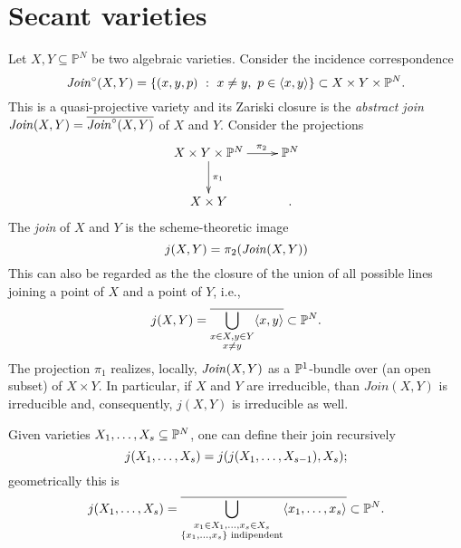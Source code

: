  \section{Secant varieties}
 \label{geometrySecants-section-secants}
 
 \begin{definition}
 \label{geometrySecants-definition-join}
 Let $X,Y \subseteq \mathbb{P}^N$ be two algebraic varieties. Consider the incidence correspondence 
 \[
     \mathit{Join}^\circ(X,Y) = \{(x,y,p) ~:~ x \neq y,~p \in \langle x,y \rangle\} \subset X \times Y \times \mathbb{P}^N.
 \]
 This is a quasi-projective variety and its Zariski closure is the {\it abstract join} $\mathit{Join}(X,Y) = \overline{\mathit{Join}^\circ(X,Y)}$ of $X$ and $Y$. Consider the projections 
 \[
     \xymatrix{
         X \times Y \times \bbP^N \ar[d]^{\pi_1} \ar[r]^(0.65){\pi_2} & \bbP^N\\
         X \times Y & .
     }
 \]
 The \emph{join} of $X$ and $Y$ is the scheme-theoretic image 
 \[
     j(X,Y) = \pi_2(\mathit{Join}(X,Y))
 \]
 This can also be regarded as the the closure of the union of all possible lines joining a point of $X$ and a point of $Y$, i.e.,
 \[
     j(X,Y) = \overline{ \bigcup_{\substack{x \in X, y \in Y \\ x \neq y}} \langle x,y \rangle} \subset \mathbb{P}^N.
 \]
 The projection $\pi_1$ realizes, locally, $\mathit{Join}(X,Y)$ as a $\mathbb{P}^1$-bundle over (an open subset) of $X \times Y$. In particular, if $X$ and $Y$ are irreducible, than $Join(X,Y)$ is irreducible and, consequently, $j(X,Y)$ is irreducible as well.
 
 Given varieties $X_1 , \ldots , X_s \subseteq \mathbb{P}^N$, one can define their join recursively
 \[
     j( X_1 , \ldots , X_s) = j( j(X_1 , \ldots , X_{s-1}), X_s);
 \]
 geometrically this is 
 \[
     j( X_1 , \ldots , X_s) = \overline{\bigcup_{\substack{x_1 \in X_1,\ldots,x_s \in X_s \\ \{x_1,\ldots,x_s\} \text{ indipendent}}} \langle x_1,\ldots,x_s \rangle} \subset \mathbb{P}^N.
 \]
 \end{definition}
 

